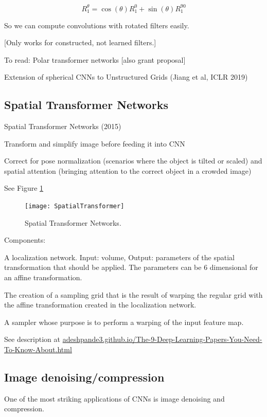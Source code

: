 \documentclass[english]{article}
\begin{document}
$$R_1^{\theta} = \cos(\theta) R_1^0 + \sin(\theta) R_1^{90} $$

So we can compute convolutions with rotated filters easily.

[Only works for constructed, not learned filters.]

\item To read: Polar transformer networks [also grant proposal]

\item Extension of spherical CNNs to Unstructured Grids (Jiang et al, ICLR 2019)

\eenum

\subsection{Spatial Transformer Networks}
\benum
\item Spatial Transformer Networks  (2015)

Transform and simplify image before feeding it into CNN

Correct for pose normalization (scenarios where the object is tilted or scaled) and spatial attention (bringing attention to the correct object in a crowded image)

 See Figure \ref{STN}

\begin{figure}
  \centering
  \texttt{[image: SpatialTransformer]}
  \caption{Spatial Transformer Networks.}
  \label{STN}
\end{figure}

Components: 

A localization network. Input: volume, Output: parameters of the spatial transformation that should be applied. The parameters can be 6 dimensional for an affine transformation.

The creation of a sampling grid that is the result of warping the regular grid with the affine transformation created in the localization network.

A sampler whose purpose is to perform a warping of the input feature map.

See description at \url{adeshpande3.github.io/The-9-Deep-Learning-Papers-You-Need-To-Know-About.html}
\eenum 


\subsection{Image denoising/compression}
\benum
\item One of the most striking applications of CNNs is image denoising and compression. 
\end{document}
